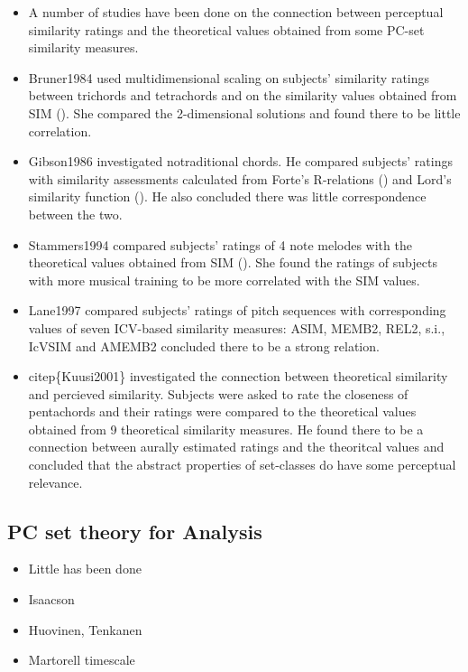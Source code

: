 \documentclass{article}
\begin{document}
\begin{itemize}
\item A number of studies have been done on the connection between
  perceptual similarity ratings and the theoretical values obtained
  from some PC-set similarity measures.
\item Bruner1984 used multidimensional scaling on subjects' similarity
  ratings between trichords and tetrachords and on the similarity
  values obtained from SIM (\citep{Morris1979}). She compared the
  2-dimensional solutions and found there to be little
  correlation.
\item Gibson1986 investigated notraditional chords. He compared subjects'
  ratings with similarity assessments calculated from Forte's
  R-relations (\citep{Forte1973}) and Lord's similarity function
  (\citep{Lord1981}). He also concluded there was little
  correspondence between the two.
\item Stammers1994 compared subjects' ratings of 4 note melodes with the
  theoretical values obtained from SIM (\citep{Morris1979}). She found
  the ratings of subjects with more musical training to be more
  correlated with the SIM values.
\item Lane1997 compared subjects' ratings of pitch sequences with
  corresponding values of seven ICV-based similarity measures: ASIM,
  MEMB2, REL2, s.i., IcVSIM and AMEMB2 concluded there to be a strong
  relation.
\item citep\{Kuusi2001\} investigated the connection between theoretical
  similarity and percieved similarity. Subjects were asked to rate the
  closeness of pentachords and their ratings were compared to the
  theoretical values obtained from 9 theoretical similarity
  measures. He found there to be a connection between aurally
  estimated ratings and the theoritcal values and concluded that the
  abstract properties of set-classes do have some perceptual
  relevance.
\end{itemize}
\subsection{PC set theory for Analysis}
\label{sec-3-6}

\begin{itemize}
\item Little has been done
\item Isaacson
\item Huovinen, Tenkanen
\item Martorell timescale
\end{itemize}
\end{document}
